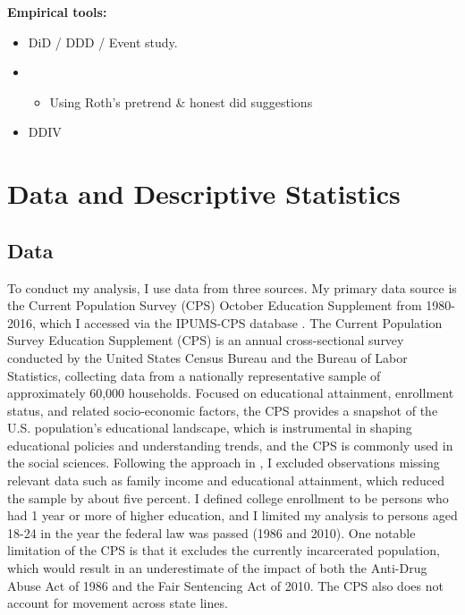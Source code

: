 \documentclass{article}
\begin{document}
\textbf{Empirical tools:}
\begin{itemize}[itemsep=0.05mm, parsep=0pt]
  \item DiD / DDD / Event study.
  \item \begin{itemize}
    \item Using Roth's pretrend \& honest did suggestions
  \end{itemize}
  \item DDIV
\end{itemize}

\section{Data and Descriptive Statistics}

\subsection{Data}
To conduct my analysis, I use data from three sources. My primary data source is the Current Population Survey (CPS) October Education Supplement from 1980-2016, which I accessed via the IPUMS-CPS database \citep{ipums_cps}. The Current Population Survey Education Supplement (CPS) is an annual cross-sectional survey conducted by the United States Census Bureau and the Bureau of Labor Statistics, collecting data from a nationally representative sample of approximately 60,000 households. Focused on educational attainment, enrollment status, and related socio-economic factors, the CPS provides a snapshot of the U.S. population's educational landscape, which is instrumental in shaping educational policies and understanding trends, and the CPS is commonly used in the social sciences. Following the approach in \cite{britton2022}, I excluded observations missing relevant data such as family income and educational attainment, which reduced the sample by about five percent. I defined college enrollment to be persons who had 1 year or more of higher education, and I limited my analysis to persons aged 18-24 in the year the federal law was passed (1986 and 2010). One notable limitation of the CPS is that it excludes the currently incarcerated population, which would result in an underestimate of the impact of both the Anti-Drug Abuse Act of 1986 and the Fair Sentencing Act of 2010. The CPS also does not account for movement across state lines.
\end{document}
